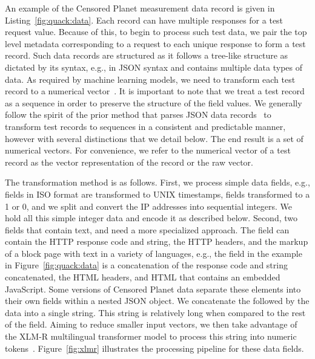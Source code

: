 An example of the Censored Planet measurement data record is given in
	Listing~\ref{fig:quack:data}. Each record can have multiple responses for a
	test request value.  Because of this, to begin to process such test data, we
	pair the top level metadata corresponding to a request to each unique
	response to form a test record.  Such data records are structured as it
	follows a tree-like structure as dictated by its syntax, e.g., in JSON syntax
	and contains multiple data types of data.
	As required by machine learning models, we need to
	transform each test record to a numerical 
	vector~\cite{sarabi_characterizing_2018}.  It is important to note
	that we treat a test record as a sequence in order to preserve the
	structure of the field values.  We generally follow the
	spirit of the prior method that parses JSON data
	records~\cite{sarabi_characterizing_2018} to transform test records to
	sequences in a consistent and predictable manner, however 
	with several distinctions that we detail below.  The end result is a set of
	numerical vectors. For convenience, we
	refer to the numerical vector of a test record as the vector representation of
	the record or the raw vector. 

The transformation method is as follows. First, we process simple data fields,
e.g.,  fields in ISO format are transformed to UNIX timestamps, 
fields transformed to a 1 or 0, and we split and convert the IP addresses into
sequential integers. We hold all this simple integer data and encode it as described below.
%
Second, two fields that contain text,  and  need a more specialized
approach.  The 
field can contain the HTTP response code and
string, the HTTP headers, and the markup of a block page with text in a variety of
languages, e.g., the  field in the example in
Figure~\ref{fig:quack:data} is a concatenation of the response code and string concatenated, the
HTML headers, and HTML that contains an embedded
JavaScript. Some versions of Censored Planet data separate these elements into their own fields within
a nested JSON object.  We concatenate the  followed by the  data into a single string. This string is relatively long when compared to the rest of the field. Aiming to reduce smaller input vectors, 
we then take advantage of the XLM-R multilingual transformer model
to process this string into numeric tokens~\cite{conneau2020unsupervised}. Figure~\ref{fig:xlmr} illustrates the processing pipeline
for these data fields. 

